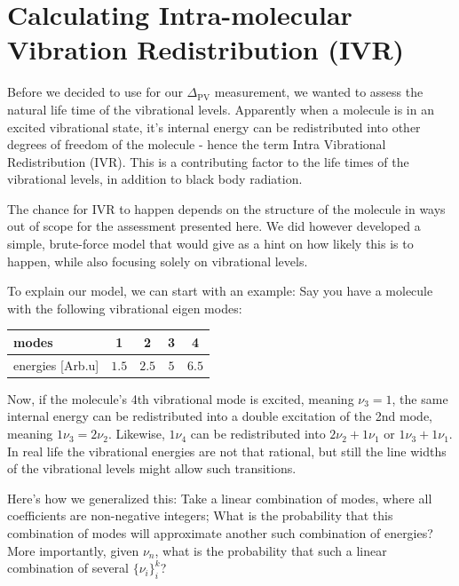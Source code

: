 \chapter{Calculating Intra-molecular Vibration Redistribution (IVR)}\label{chap:IVR}

Before we decided to use  for our $\Delta_\mathrm{PV}$ measurement, we wanted to assess the natural life time of the vibrational levels. Apparently when a molecule is in an excited vibrational state, it's internal energy can be redistributed into other degrees of freedom of the molecule - hence the term Intra Vibrational Redistribution (IVR)\cite{IVR_review}. This is a contributing factor to the life times of the vibrational levels, in addition to black body radiation.

The chance for IVR to happen depends on the structure of the molecule in ways out of scope for the assessment presented here. We did however developed a simple, brute-force model that would give as a hint on how likely this is to happen, while also focusing solely on vibrational levels.

To explain our model, we can start with an example: Say you have a molecule with the following vibrational eigen modes:

\begin{table}[h]
\centering
\begin{tabular}{l|c|c|c|c}
	modes & 1 & 2 & 3 & 4 \\
	\hline
	energies [Arb.u] & $1.5$ &  $2.5$ & $5$ & $6.5$ \\
\end{tabular}
\end{table}


Now, if the molecule's 4th vibrational mode is excited, meaning $\nu_3 = 1$, the same internal energy can be redistributed into a double excitation of the 2nd mode, meaning $1 \nu_3 = 2\nu_2$. Likewise, $ 1 \nu_4$ can be redistributed into $2 \nu_2 + 1 \nu_1$ or $1 \nu_3 + 1 \nu_1$. In real life the vibrational energies are not that rational, but still the line widths of the vibrational levels might allow such transitions.

Here's how we generalized this: Take a linear combination of modes, where all coefficients are non-negative integers; What is the probability that this combination of modes will approximate another such combination of energies? More importantly, given $\nu_n$, what is the probability that such a linear combination of several $\{\nu_i\}_i^k$?

